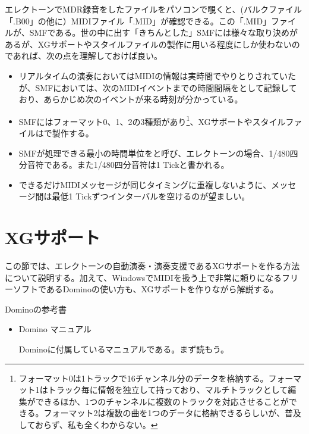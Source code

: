 \documentclass[uplatex, 10pt, dvipdfmx]{jsarticle}
\numberwithin{equation}{section}
\newcommand{\emphj}[1]{\textbf{\textrm{\textgt{{#1}}}}}
\begin{document}
エレクトーンでMDR録音をしたファイルをパソコンで覗くと、(バルクファイル「.B00」の他に）MIDIファイル「.MID」が確認できる。この「.MID」ファイルが、SMFである。世の中に出す「きちんとした」SMFには様々な取り決めがあるが、XGサポートやスタイルファイルの製作に用いる程度にしか使わないのであれば、次の点を理解しておけば良い。
\begin{itemize}
\item リアルタイムの演奏においてはMIDIの情報は実時間でやりとりされていたが、SMFにおいては、次のMIDIイベントまでの時間間隔を\emphj{デルタタイム}として記録しており、あらかじめ次のイベントが来る時刻が分かっている。
\item SMFにはフォーマット0、1、2の3種類があり\footnote{フォーマット0は1トラックで16チャンネル分のデータを格納する。フォーマット1はトラック毎に情報を独立して持っており、マルチトラックとして編集ができるほか、1つのチャンネルに複数のトラックを対応させることができる。フォーマット2は複数の曲を1つのデータに格納できるらしいが、普及しておらず、私も全くわからない。}、XGサポートやスタイルファイルは\emphj{フォーマット0}で製作する。
\item SMFが処理できる最小の時間単位を\emphj{分解能}と呼び、エレクトーンの場合、1/480四分音符である。また1/480四分音符は1 Tickと書かれる。
\item できるだけMIDIメッセージが同じタイミングに重複しないように、メッセージ間は最低1 Tickずつインターバルを空けるのが望ましい\footnotemark。
\end{itemize}

\clearpage

\section{XGサポート}
この節では、エレクトーンの自動演奏・演奏支援であるXGサポートを作る方法について説明する。加えて、WindowsでMIDIを扱う上で非常に頼りになるフリーソフトであるDominoの使い方も、XGサポートを作りながら解説する。

\begin{itembox}{Dominoの参考書}
\begin{itemize}

\item Domino マニュアル

Dominoに付属しているマニュアルである。まず読もう。


\end{itemize}
\end{itembox}
\end{document}
